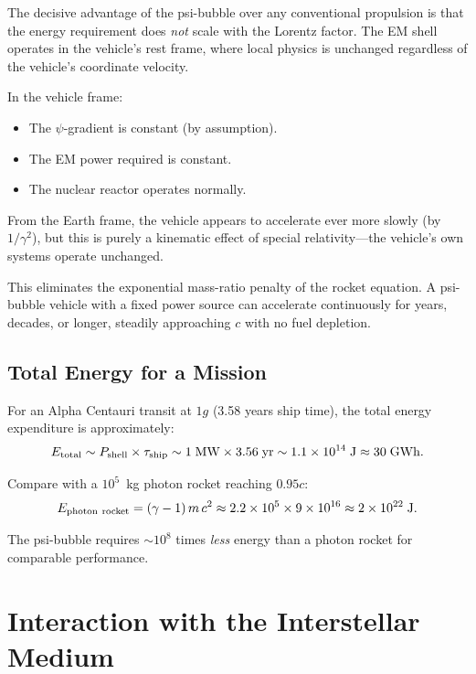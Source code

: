 \documentclass[aps,prd,twocolumn,superscriptaddress,nofootinbib]{revtex4-2}
\newcommand{\ee}[1]{\times 10^{#1}}
\begin{document}
The decisive advantage of the psi-bubble over any conventional
propulsion is that the energy requirement does \textit{not} scale
with the Lorentz factor.  The EM shell operates in the vehicle's
rest frame, where local physics is unchanged regardless of the
vehicle's coordinate velocity.

In the vehicle frame:
\begin{itemize}
\item The $\psi$-gradient is constant (by assumption).
\item The EM power required is constant.
\item The nuclear reactor operates normally.
\end{itemize}

From the Earth frame, the vehicle appears to accelerate ever more
slowly (by $1/\gamma^2$), but this is purely a kinematic effect of
special relativity---the vehicle's own systems operate unchanged.

This eliminates the exponential mass-ratio penalty of the rocket
equation.  A psi-bubble vehicle with a fixed power source can
accelerate continuously for years, decades, or longer, steadily
approaching $c$ with no fuel depletion.

\subsection{Total Energy for a Mission}

For an Alpha Centauri transit at $1g$ (3.58 years ship time),
the total energy expenditure is approximately:
\begin{equation}
E_{\rm total} \sim P_{\rm shell}\times\tau_{\rm ship}
\sim 1\;\text{MW}\times 3.56\;\text{yr}
\sim 1.1\ee{14}\;\text{J} \approx 30\;\text{GWh}.
\end{equation}

Compare with a $10^5$~kg photon rocket reaching $0.95c$:
\begin{equation}
E_{\rm photon\ rocket} = (\gamma - 1)\,m\,c^2
\approx 2.2 \times 10^5 \times 9\ee{16}
\approx 2\ee{22}\;\text{J}.
\end{equation}

The psi-bubble requires $\sim 10^8$ times \textit{less} energy than a
photon rocket for comparable performance.

\section{Interaction with the Interstellar Medium}\label{sec:ism}
\end{document}
